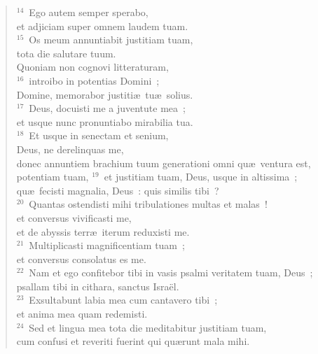 \begin{flushleft}
\begin{verse}
${}^{14}$~Ego autem semper sperabo,\\ et adjiciam super omnem laudem tuam.\\
${}^{15}$~Os meum annuntiabit justitiam tuam,\\ tota die salutare tuum.\\ Quoniam non cognovi litteraturam,\\
${}^{16}$~introibo in potentias Domini~;\\ Domine, memorabor justiti\ae\ tu\ae\ solius.\\
${}^{17}$~Deus, docuisti me a juventute mea~;\\ et usque nunc pronuntiabo mirabilia tua.\\
${}^{18}$~Et usque in senectam et senium,\\ Deus, ne derelinquas me,\\ donec annuntiem brachium tuum generationi omni qu\ae\ ventura est,\\ potentiam tuam,
${}^{19}$~et justitiam tuam, Deus, usque in altissima~;\\ qu\ae\ fecisti magnalia, Deus~: quis similis tibi~?\\
${}^{20}$~Quantas ostendisti mihi tribulationes multas et malas~!\\ et conversus vivificasti me,\\ et de abyssis terr\ae\ iterum reduxisti me.\\
${}^{21}$~Multiplicasti magnificentiam tuam~;\\ et conversus consolatus es me.\\
${}^{22}$~Nam et ego confitebor tibi in vasis psalmi veritatem tuam, Deus~;\\ psallam tibi in cithara, sanctus Isra\"el.\\
${}^{23}$~Exsultabunt labia mea cum cantavero tibi~;\\ et anima mea quam redemisti.\\
${}^{24}$~Sed et lingua mea tota die meditabitur justitiam tuam,\\ cum confusi et reveriti fuerint qui qu\ae runt mala mihi.\end{verse}\end{flushleft}




